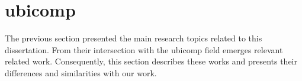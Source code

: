 \section{\acl{ubicomp}}
\label{sec:soa_ubicomp}

The previous section presented the main research topics related to this dissertation.
From their intersection with the \ac{ubicomp} field emerges relevant related work.
Consequently, this section describes these works and presents their differences and similarities with our work.



%